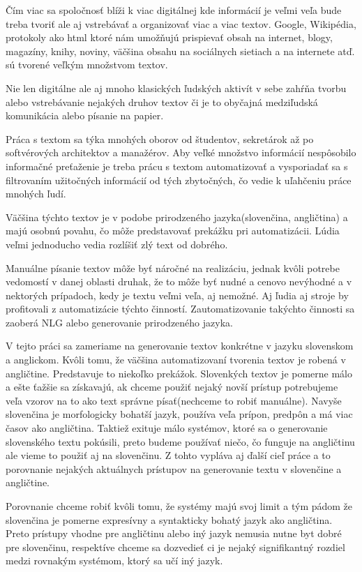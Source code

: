 Čím viac sa spoločnosť blíži k viac digitálnej kde informácií je veľmi veľa bude treba tvoriť ale aj vstrebávať a organizovať viac a viac textov. Google, Wikipédia, protokoly ako html ktoré nám umožňujú prispievať obsah na internet, blogy, magazíny, knihy, noviny, väčšina obsahu na sociálnych sietiach a na internete atď. sú tvorené veľkým množstvom textov.

Nie len digitálne ale aj mnoho klasických ľudských aktivít v sebe zahŕňa tvorbu alebo vstrebávanie nejakých druhov textov či je to obyčajná medziľudská komunikácia alebo písanie na papier.

Práca s textom sa týka mnohých oborov od študentov, sekretárok až po softvérových architektov a manažérov. Aby veľké množstvo informácií nespôsobilo informačné preťaženie je treba prácu s textom automatizovať a vysporiadať sa s filtrovaním užitočných informácií od tých zbytočných, čo vedie k uľahčeniu práce mnohých ľudí.

Väčšina týchto textov je v podobe prirodzeného jazyka(slovenčina, angličtina) a majú osobnú povahu, čo môže predstavovať prekážku pri automatizácii. Lúdia veľmi jednoducho vedia rozlíšiť zlý text od dobrého.

Manuálne písanie textov môže byť náročné na realizáciu, jednak kvôli potrebe vedomostí v danej oblasti druhak, že to môže byť nudné a cenovo nevýhodné a v nektorých prípadoch, kedy je textu veľmi veľa, aj nemožné. Aj ľudia aj stroje by profitovali z automatizácie týchto činností. Zautomatizovanie takýchto činnosti sa zaoberá NLG alebo generovanie prirodzeného jazyka.

V tejto práci sa zameriame na generovanie textov konkrétne v jazyku slovenskom a anglickom. Kvôli tomu, že väčšina automatizovaní tvorenia textov je robená v angličtine. Predstavuje to niekoľko prekážok. Slovenkých textov je pomerne málo a ešte ťažšie sa získavajú, ak chceme použiť nejaký novší prístup potrebujeme veľa
vzorov na to ako text správne písať(nechceme to robiť manuálne). Navyše slovenčina je morfologicky bohatší jazyk, používa veľa prípon, predpôn a má viac časov ako angličtina. Taktiež exituje málo systémov, ktoré sa o generovanie slovenského textu pokúsili, preto budeme používať niečo, čo funguje na angličtinu ale vieme to použiť aj na slovenčinu. Z tohto vypláva aj ďalší cieľ práce a to porovnanie nejakých aktuálnych prístupov na generovanie textu v slovenčine a angličtine.

Porovnanie chceme robiť kvôli tomu, že systémy majú svoj limit a tým pádom že slovenčina je pomerne expresívny a syntakticky bohatý jazyk ako angličtina. Preto prístupy vhodne pre angličtinu alebo iný jazyk nemusia nutne byt dobré pre slovenčinu, respektíve chceme sa dozvedieť ci je nejaký signifikantný rozdiel medzi rovnakým systémom, ktorý sa učí iný jazyk.

